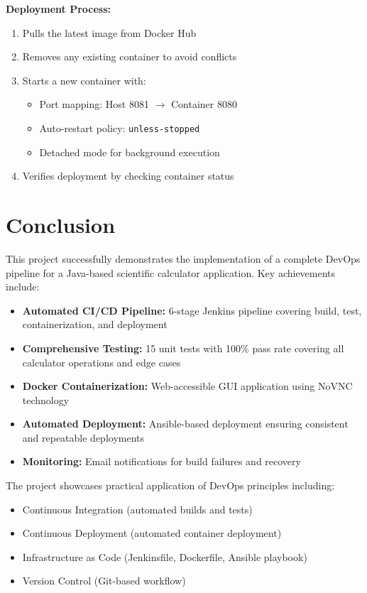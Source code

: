 \documentclass[12pt,a4paper]{article}
\begin{document}
\textbf{Deployment Process:}
\begin{enumerate}
    \item Pulls the latest image from Docker Hub
    \item Removes any existing container to avoid conflicts
    \item Starts a new container with:
    \begin{itemize}
        \item Port mapping: Host 8081 $\rightarrow$ Container 8080
        \item Auto-restart policy: \texttt{unless-stopped}
        \item Detached mode for background execution
    \end{itemize}
    \item Verifies deployment by checking container status
\end{enumerate}

\section{Conclusion}

This project successfully demonstrates the implementation of a complete DevOps pipeline for a Java-based scientific calculator application. Key achievements include:

\begin{itemize}
    \item \textbf{Automated CI/CD Pipeline:} 6-stage Jenkins pipeline covering build, test, containerization, and deployment
    \item \textbf{Comprehensive Testing:} 15 unit tests with 100\% pass rate covering all calculator operations and edge cases
    \item \textbf{Docker Containerization:} Web-accessible GUI application using NoVNC technology
    \item \textbf{Automated Deployment:} Ansible-based deployment ensuring consistent and repeatable deployments
    \item \textbf{Monitoring:} Email notifications for build failures and recovery
\end{itemize}

The project showcases practical application of DevOps principles including:
\begin{itemize}
    \item Continuous Integration (automated builds and tests)
    \item Continuous Deployment (automated container deployment)
    \item Infrastructure as Code (Jenkinsfile, Dockerfile, Ansible playbook)
    \item Version Control (Git-based workflow)
\end{itemize}
\end{document}
